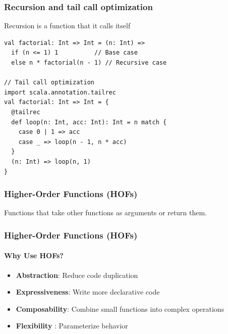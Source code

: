 \documentclass{beamer}
\begin{document}
\begin{frame}[fragile]
\frametitle{Recursion and tail call optimization}

Recursion is a function that it calls itself

\begin{lstlisting}[style=scalaStyle]
val factorial: Int => Int = (n: Int) => 
  if (n <= 1) 1          // Base case
  else n * factorial(n - 1) // Recursive case

// Tail call optimization
import scala.annotation.tailrec
val factorial: Int => Int = {
  @tailrec
  def loop(n: Int, acc: Int): Int = n match {
    case 0 | 1 => acc
    case _ => loop(n - 1, n * acc)
  }
  (n: Int) => loop(n, 1)
}

\end{lstlisting}
\end{frame}

\begin{frame}[fragile]
\frametitle{Higher-Order Functions (HOFs)}

Functions that take other functions as arguments or return them.

\end{frame}

\begin{frame}[fragile]
\frametitle{Higher-Order Functions (HOFs)}
\framesubtitle{Why Use HOFs?}

\begin{itemize}
    \item \textbf{Abstraction}: Reduce code duplication
    \item \textbf{Expressiveness}: Write more declarative code
    \item \textbf{Composability}: Combine small functions into complex operations
    \item \textbf{Flexibility} : Parameterize behavior
\end{itemize}

\end{frame}
\end{document}
